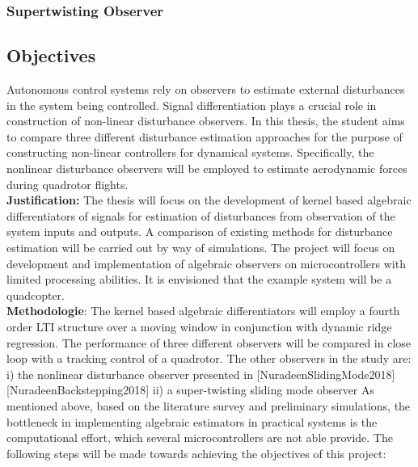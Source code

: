 \documentclass{article}
\begin{document}
\subsubsection{Supertwisting Observer}


\subsection{Objectives}
Autonomous control systems rely on observers to estimate external disturbances in the system being controlled. Signal differentiation plays a crucial role in construction of non-linear disturbance observers. In this thesis, the student aims to compare three different disturbance estimation approaches for the purpose of constructing non-linear controllers for dynamical systems. Specifically, the nonlinear disturbance observers will be employed to estimate aerodynamic forces during quadrotor flights. \\
\textbf{Justification:} The thesis will focus on the development of kernel based algebraic differentiators of signals for estimation of disturbances from observation of the system inputs and outputs. A comparison of existing methods for
disturbance estimation will be carried out by way of simulations.  
The project will focus on development and implementation of algebraic observers on microcontrollers with limited processing abilities. It is envisioned that the example system will be a quadcopter.\\
\textbf{Methodologie}: The kernel based algebraic differentiators will employ a fourth order LTI structure over a moving window in conjunction with dynamic ridge regression. 
The performance of three different observers will be compared in close loop with a tracking control of a quadrotor. The other observers in the study are:
i) the nonlinear disturbance observer presented in [NuradeenSlidingMode2018] [NuradeenBackstepping2018]
ii) a super-twisting sliding mode observer
As mentioned above, based on the literature survey and preliminary simulations, the bottleneck in implementing algebraic estimators in practical systems is the computational effort, which several microcontrollers are not able provide.
The following steps will be made towards achieving the objectives of this project: 
\end{document}
